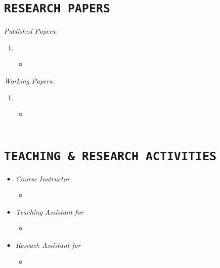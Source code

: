 \documentclass{cls/Curriculum_Vitae_Class}
\begin{document}
\section{\texttt{RESEARCH PAPERS}}
\textit{Published Papers}:
	\begin{enumerate}
		\item {}
		\begin{itemize}
			\item[] \\
		\end{itemize}
	\end{enumerate}
\textit{Working Papers}:
	\begin{enumerate}
		\item {}
		\begin{itemize}
			\item[] \\~\\
		\end{itemize}
	\end{enumerate}


\section{\texttt{TEACHING \& RESEARCH ACTIVITIES}}
\begin{itemize}
	\item \textit{Course Instructor}
	\begin{itemize}
		\item[] 
	\end{itemize}
	\item \textit{Teaching Assistant for}
	\begin{itemize}
		\item[] 
	\end{itemize}
	\item \textit{Reseach Assistant for}
	\begin{itemize}
		\item[] \\~\\
	\end{itemize}
\end{itemize}
\end{document}
